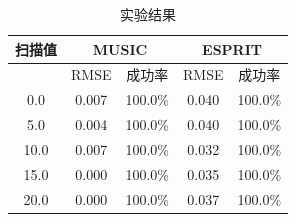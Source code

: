 \begin{table}[htbp]
  \centering
  \caption{实验结果}
  \label{tab:results}
  \begin{tabular}{c|cc|cc}
    \hline
    扫描值 & \multicolumn{2}{c}{MUSIC} & \multicolumn{2}{c}{ESPRIT} \\
    \hline
     & RMSE & 成功率 & RMSE & 成功率 \\
    \hline
    0.0 & 0.007 & 100.0\% & 0.040 & 100.0\% \\
    5.0 & 0.004 & 100.0\% & 0.040 & 100.0\% \\
    10.0 & 0.007 & 100.0\% & 0.032 & 100.0\% \\
    15.0 & 0.000 & 100.0\% & 0.035 & 100.0\% \\
    20.0 & 0.000 & 100.0\% & 0.037 & 100.0\% \\
    \hline
  \end{tabular}
\end{table}